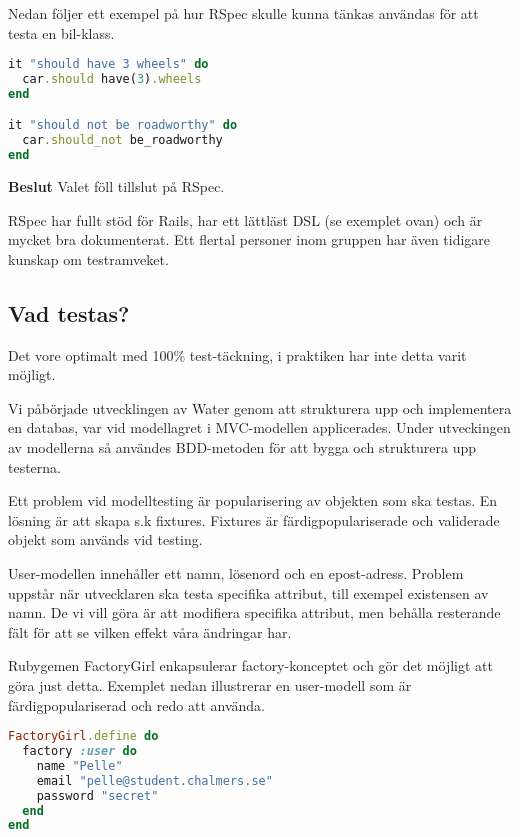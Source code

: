 Nedan följer ett exempel på hur RSpec skulle kunna tänkas användas för att testa en bil-klass.

\begin{lstlisting}[language=Ruby]
it "should have 3 wheels" do
  car.should have(3).wheels
end

it "should not be roadworthy" do
  car.should_not be_roadworthy
end
\end{lstlisting}

\begin{flushright}
  
  \textbf{Beslut}
    Valet föll tillslut på RSpec.

    RSpec har fullt stöd för Rails, har ett lättläst DSL (se exemplet ovan) och är mycket bra dokumenterat. Ett flertal personer inom gruppen har även tidigare kunskap om testramveket.
\end{flushright}

\subsection{Vad testas?}
Det vore optimalt med 100\% test-täckning, i praktiken har inte detta varit möjligt.

Vi påbörjade utvecklingen av Water genom att strukturera upp och implementera en databas, var vid modellagret i MVC-modellen applicerades. Under utveckingen av modellerna så användes BDD-metoden för att bygga och strukturera upp testerna. 

Ett problem vid modelltesting är popularisering av objekten som ska testas. En lösning är att skapa s.k fixtures. Fixtures är färdigpopulariserade och validerade objekt som används vid testing.

User-modellen innehåller ett namn, lösenord och en epost-adress. Problem uppstår när utvecklaren ska testa specifika attribut, till exempel existensen av namn. De vi vill göra är att modifiera specifika attribut, men behålla resterande fält för att se vilken effekt våra ändringar har.

Rubygemen FactoryGirl enkapsulerar factory-konceptet och gör det möjligt att göra just detta. Exemplet nedan illustrerar en user-modell som är färdigpopulariserad och redo att använda.

\begin{lstlisting}[language=Ruby]
FactoryGirl.define do
  factory :user do
    name "Pelle"
    email "pelle@student.chalmers.se"
    password "secret"
  end
end
\end{lstlisting}

